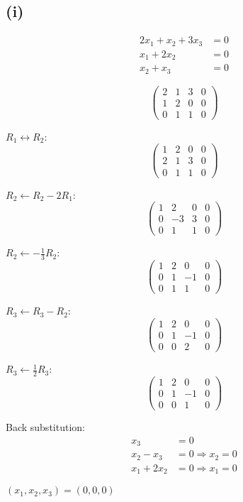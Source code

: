 \subsection*{(i)}
\begin{align*}
	2x_1 + x_2 + 3x_3 & = 0 \\
	x_1 + 2x_2        & = 0 \\
	x_2 + x_3         & = 0
\end{align*}

\[
	\left(\begin{array}{ccc|c}
			2 & 1 & 3 & 0 \\
			1 & 2 & 0 & 0 \\
			0 & 1 & 1 & 0
		\end{array}\right)
\]

$R_1 \leftrightarrow R_2$:
\[
	\left(\begin{array}{ccc|c}
			1 & 2 & 0 & 0 \\
			2 & 1 & 3 & 0 \\
			0 & 1 & 1 & 0
		\end{array}\right)
\]

$R_2 \leftarrow R_2 - 2R_1$:
\[
	\left(\begin{array}{ccc|c}
			1 & 2  & 0 & 0 \\
			0 & -3 & 3 & 0 \\
			0 & 1  & 1 & 0
		\end{array}\right)
\]

$R_2 \leftarrow -\frac{1}{3}R_2$:
\[
	\left(\begin{array}{ccc|c}
			1 & 2 & 0  & 0 \\
			0 & 1 & -1 & 0 \\
			0 & 1 & 1  & 0
		\end{array}\right)
\]

$R_3 \leftarrow R_3 - R_2$:
\[
	\left(\begin{array}{ccc|c}
			1 & 2 & 0  & 0 \\
			0 & 1 & -1 & 0 \\
			0 & 0 & 2  & 0
		\end{array}\right)
\]

$R_3 \leftarrow \frac{1}{2}R_3$:
\[
	\left(\begin{array}{ccc|c}
			1 & 2 & 0  & 0 \\
			0 & 1 & -1 & 0 \\
			0 & 0 & 1  & 0
		\end{array}\right)
\]

Back substitution:
\begin{align*}
	x_3 &= 0 \\
	x_2 - x_3 &= 0 \Rightarrow x_2 = 0 \\
	x_1 + 2x_2 &= 0 \Rightarrow x_1 = 0
\end{align*}

$\boxed{(x_1, x_2, x_3) = (0, 0, 0)}$
